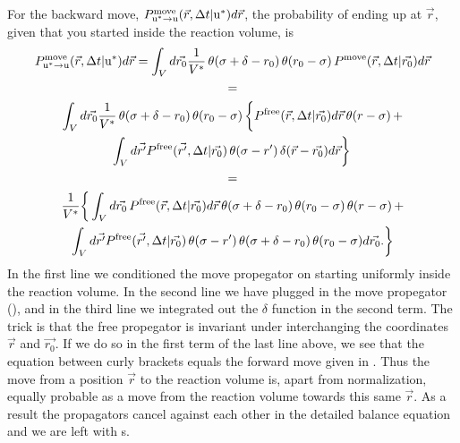 For the backward move, $P_{\rm{u^*} \to \rm{u}}^{\rm move}(\vec{r},\Delta t|{\rm u^*})d\vec{r}$, the probability of ending up at $\vec{r}$, given that you started inside the reaction volume, is
\begin{multline}
P_{\rm{u^*} \to \rm{u}}^{\rm move}(\vec{r},\Delta t|{\rm u^*})d\vec{r} = \int_{V} d\vec{r_0} \frac{1}{V^*} \, \theta(\sigma + \delta - r_0) \, \theta(r_0 - \sigma) \, P^{\rm move}(\vec{r},\Delta t|\vec{r_0})d\vec{r} 
\\ =
\\ \int_{V} d\vec{r_0} \frac{1}{V^*} \, \theta(\sigma + \delta - r_0) \, \theta(r_0 - \sigma) \, \bigg\{ P^{\rm free}(\vec{r},\Delta t|\vec{r_0}) d\vec{r} \, \theta(r - \sigma) \, + 
\\ \int_{V} d\vec{r'} P^{\rm free}(\vec{r'},\Delta t|\vec{r_0}) \, \theta(\sigma - r') \, \delta(\vec{r} - \vec{r_0}) d\vec{r} \bigg\} \, 
\\ = 
\\ \frac{1}{V^*} \bigg\{ \int_{V} d\vec{r_0} \, P^{\rm free}(\vec{r},\Delta t|\vec{r_0}) d\vec{r} \, \theta(\sigma + \delta - r_0) \, \theta(r_0 - \sigma) \, \theta(r - \sigma) \, + 
\\ \int_{V} d\vec{r'} P^{\rm free}(\vec{r'},\Delta t|\vec{r_0}) \, \theta(\sigma - r') \, \theta(\sigma + \delta - r_0)  \, \theta(r_0 - \sigma) d\vec{r_0}. \bigg\}
\end{multline}
In the first line we conditioned the move propegator on starting uniformly inside the reaction volume. In the second line we have plugged in the move propegator (), and in the third line we integrated out the $\delta$ function in the second term. The trick is that the free propegator is invariant under interchanging the coordinates $\vec{r}$ and $\vec{r_0}$. If we do so in the first term of the last line above, we see that the equation between curly brackets equals the forward move given in . Thus the move from a position $\vec{r}$ to the reaction volume is, apart from normalization, equally probable as a move from the reaction volume towards this same $\vec{r}$. As a result the propagators cancel against each other in the detailed balance equation and we are left with s.